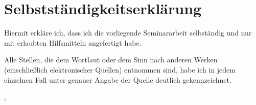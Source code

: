 \clearpage
\section*{Selbstständigkeitserklärung}

Hiermit erkläre ich, dass ich die vorliegende Seminararbeit selbständig und nur mit erlaubten Hilfsmitteln angefertigt habe.

\vspace*{3ex}

\noindent
Alle Stellen, die dem Wortlaut oder dem Sinn nach anderen Werken (einschließlich elektronischer Quellen) entnommen sind, habe ich in jedem einzelnen Fall unter genauer Angabe der Quelle deutlich gekennzeichnet.

\vspace*{10ex}

\noindent
\docauthor

\noindent
\docplace, \docdate
